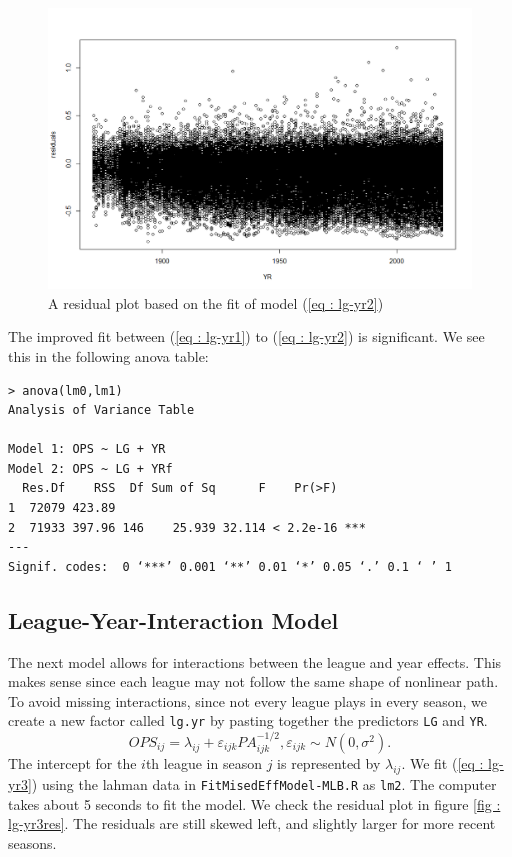 \documentclass [52pt] {article}
\begin{document}
\begin{figure}[h!]
\centering
\includegraphics[scale = 0.5]{lg-yr_add-res2.png}
\caption{\label{fig : lg-yr2res} A residual plot based on the fit of model (\ref{eq : lg-yr2})}
\end{figure}
The improved fit between (\ref{eq : lg-yr1}) to (\ref{eq : lg-yr2}) is significant.  We see this in the following anova table:
\begin{verbatim}
> anova(lm0,lm1)
Analysis of Variance Table

Model 1: OPS ~ LG + YR
Model 2: OPS ~ LG + YRf
  Res.Df    RSS  Df Sum of Sq      F    Pr(>F)    
1  72079 423.89                                   
2  71933 397.96 146    25.939 32.114 < 2.2e-16 ***
---
Signif. codes:  0 ‘***’ 0.001 ‘**’ 0.01 ‘*’ 0.05 ‘.’ 0.1 ‘ ’ 1
\end{verbatim}

\subsection{League-Year-Interaction Model}
The next model allows for interactions between the league and year effects.  This makes sense since each league may not follow the same shape of nonlinear path.  To avoid missing interactions, since not every league plays in every season, we create a new factor called \verb|lg.yr| by pasting together the predictors \verb|LG| and \verb|YR|.
\begin{equation}\label{eq : lg-yr3}
OPS_{ij} = \lambda_{ij} + \varepsilon_{ijk} PA_{ijk}^{-1/2}, \varepsilon_{ijk}\sim N(0,\sigma^2).
\end{equation}
The intercept for the $i$th league in season $j$ is represented by $\lambda_{ij}$.  We fit (\ref{eq : lg-yr3}) using the lahman data in \verb|FitMisedEffModel-MLB.R| as \verb|lm2|.  The computer takes about 5 seconds to fit the model.  We check the residual plot in figure \ref{fig : lg-yr3res}.  The residuals are still skewed left, and slightly larger for more recent seasons.
\end{document}
